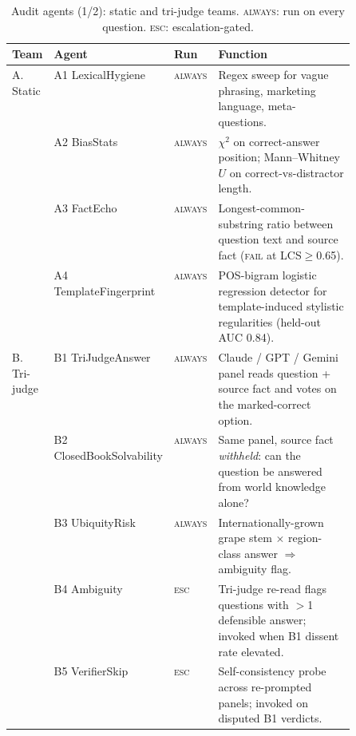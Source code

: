 \begin{table}[H]
  \centering
  \caption{Audit agents (1/2): static and tri-judge teams.
    \textsc{always}: run on every question. \textsc{esc}:
    escalation-gated.}
  \label{tab:agents-ab}
  \scriptsize
  \setlength{\tabcolsep}{4pt}
  \renewcommand{\arraystretch}{0.95}
  \begin{tabular}{lllp{0.50\linewidth}}
    \toprule
    Team & Agent & Run & Function \\
    \midrule
    \multirow{4}{*}{A. Static}
      & A1 LexicalHygiene        & \textsc{always} & Regex sweep for vague phrasing, marketing language, meta-questions. \\
      & A2 BiasStats             & \textsc{always} & $\chi^2$ on correct-answer position; Mann--Whitney $U$ on correct-vs-distractor length. \\
      & A3 FactEcho              & \textsc{always} & Longest-common-substring ratio between question text and source fact (\textsc{fail} at LCS$\geq$0.65). \\
      & A4 TemplateFingerprint   & \textsc{always} & POS-bigram logistic regression detector for template-induced stylistic regularities (held-out AUC 0.84). \\
    \midrule
    \multirow{5}{*}{B. Tri-judge}
      & B1 TriJudgeAnswer        & \textsc{always} & Claude / GPT / Gemini panel reads question + source fact and votes on the marked-correct option. \\
      & B2 ClosedBookSolvability & \textsc{always} & Same panel, source fact \emph{withheld}: can the question be answered from world knowledge alone? \\
      & B3 UbiquityRisk          & \textsc{always} & Internationally-grown grape stem $\times$ region-class answer $\Rightarrow$ ambiguity flag. \\
      & B4 Ambiguity             & \textsc{esc}    & Tri-judge re-read flags questions with $>$1 defensible answer; invoked when B1 dissent rate elevated. \\
      & B5 VerifierSkip          & \textsc{esc}    & Self-consistency probe across re-prompted panels; invoked on disputed B1 verdicts. \\
    \bottomrule
  \end{tabular}
\end{table}

